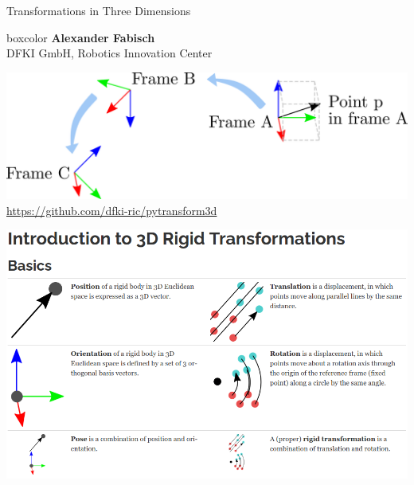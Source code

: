 \documentclass[14pt]{beamer}
\begin{document}
\begin{frame}
\begin{center}
{Transformations in Three Dimensions\par}
\vfill

\begin{beamercolorbox}[sep=0.5em,center]{boxcolor}
\textbf{Alexander Fabisch}\\
DFKI GmbH, Robotics Innovation Center
\end{beamercolorbox}

\vfill
\includegraphics[width=\textwidth]{images/transformation_modeling}
\vfill
\url{https://github.com/dfki-ric/pytransform3d}
\end{center}
\end{frame}

\begin{frame}
\includegraphics[width=\textwidth]{images/introduction}
\end{frame}
\end{document}
